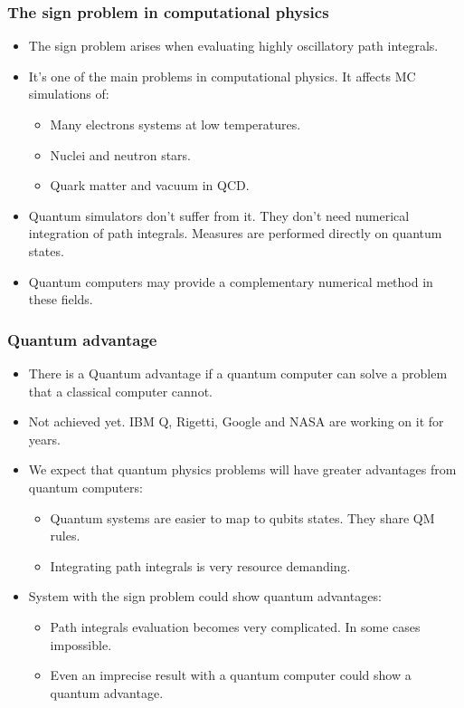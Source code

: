 \documentclass[11pt,t,xcolor=dvipsnames,aspectratio=169]{beamer}
\newlength\leftsidebar
\begin{document}
\begin{frame}
    \frametitle{The sign problem in computational physics}
    \begin{itemize}
        \item
            The sign problem arises when evaluating highly oscillatory path integrals.
        \item
            It's one of the main problems in computational physics.
            It affects MC simulations of:
            \begin{itemize}
                \item Many electrons systems at low temperatures.
                \item Nuclei and neutron stars.
                \item Quark matter and vacuum in QCD.
            \end{itemize}
        \item
            Quantum simulators don't suffer from it.
            They don't need numerical integration of path integrals.
            Measures are performed directly on quantum states.
        \item
            Quantum computers may provide a complementary numerical method in these fields.
    \end{itemize}
\end{frame}

\begin{frame}
    \frametitle{Quantum advantage}
    \begin{itemize}
        \item
            There is a Quantum advantage if a quantum computer can solve a problem that a classical computer cannot.
        \item
            Not achieved yet. IBM Q, Rigetti, Google and NASA are working on it for years.
        \item
            We expect that quantum physics problems will have greater advantages from quantum computers:
            \begin{itemize}
                \item Quantum systems are easier to map to qubits states. They share QM rules.
                \item Integrating path integrals is very resource demanding.
            \end{itemize}
        \item
            System with the sign problem could show quantum advantages:
            \begin{itemize}
                \item Path integrals evaluation becomes very complicated. In some cases impossible.
                \item Even an imprecise result with a quantum computer could show a quantum advantage.
            \end{itemize}
    \end{itemize}
\end{frame}

\leftsidebar
{
\begin{frame}[plain,t]
\titlepage
\end{frame}
}
\hoffset=0in %
\end{document}
